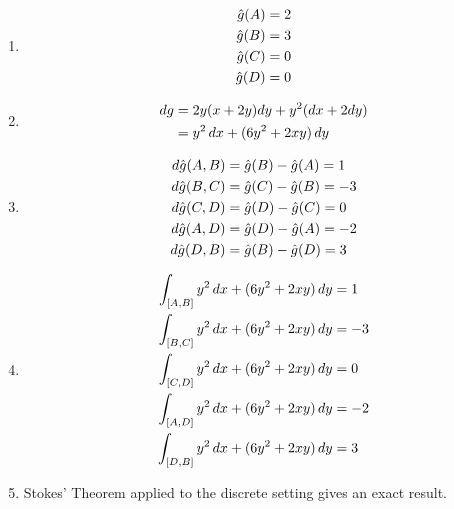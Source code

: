 \documentclass{article}
\begin{document}
\begin{enumerate}[label=(\alph*)]
    \item 
    \begin{align}
        \hat{g}(A) &= 2 \notag\\
        \hat{g}(B) &= 3 \notag\\
        \hat{g}(C) &= 0 \notag\\
        \hat{g}(D) &= 0 \notag
    \end{align}

    \item
    \begin{align}
        dg  &= 2y(x + 2y)dy + y^2(dx + 2dy) \notag\\
            &= y^2 \, dx + (6y^2 + 2xy) \, dy \notag
    \end{align}

    \item 
    \begin{align}
        d\hat{g}(A, B) &= \hat{g}(B) - \hat{g}(A) =  1  \notag\\
        d\hat{g}(B, C) &= \hat{g}(C) - \hat{g}(B) =  -3 \notag\\
        d\hat{g}(C, D) &= \hat{g}(D) - \hat{g}(C) =  0  \notag\\
        d\hat{g}(A, D) &= \hat{g}(D) - \hat{g}(A) =  -2 \notag\\
        d\hat{g}(D, B) &= \hat{g}(B) - \hat{g}(D) =  3  \notag
    \end{align}

    \item
    \begin{align}
        \int_{[A,B]} y^2 \, dx + (6y^2 + 2xy) \, dy &= 1  \notag\\
        \int_{[B,C]} y^2 \, dx + (6y^2 + 2xy) \, dy &= -3 \notag\\
        \int_{[C,D]} y^2 \, dx + (6y^2 + 2xy) \, dy &= 0  \notag\\
        \int_{[A,D]} y^2 \, dx + (6y^2 + 2xy) \, dy &= -2 \notag\\
        \int_{[D,B]} y^2 \, dx + (6y^2 + 2xy) \, dy &= 3  \notag
    \end{align}

    \item
    Stokes' Theorem applied to the discrete setting gives an exact result.
\end{enumerate}


\vspace{1.8cm}
\\\\
\end{document}
